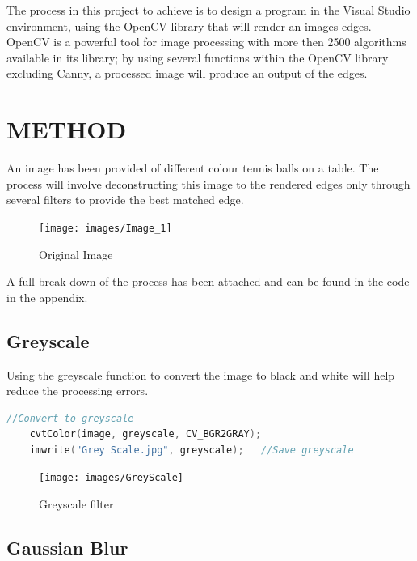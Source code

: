 \documentclass[a4paper, 10pt]{article}
\begin{document}
The process in this project to achieve is to design a program in the Visual Studio environment, using the OpenCV library that will render an images edges. OpenCV is a powerful tool for image processing with more then 2500 algorithms available in its library; by using several functions within the OpenCV library excluding Canny, a processed image will produce an output of the edges. 


\section{METHOD}

An image has been provided of different colour tennis balls on a table. The process will involve deconstructing this image to the rendered edges only through several filters to provide the best matched edge.

\begin{figure}[H]
  \texttt{[image: images/Image\_1]}
  \caption{Original Image}
  \label{fig:Original Image}
\end{figure}

A full break down of the process has been attached and can be found in the code in the appendix.

\clearpage
\subsection{Greyscale}

Using the greyscale function to convert the image to black and white will help reduce the processing errors.

\begin{lstlisting}[language = C++]
	//Convert to greyscale
	cvtColor(image, greyscale, CV_BGR2GRAY);
	imwrite("Grey Scale.jpg", greyscale);	//Save greyscale
\end{lstlisting} 

\begin{figure}[H]
  \texttt{[image: images/GreyScale]}
  \caption{Greyscale filter}
  \label{fig:Greyscale filter}
\end{figure}

\clearpage
\subsection{Gaussian Blur}
\end{document}
